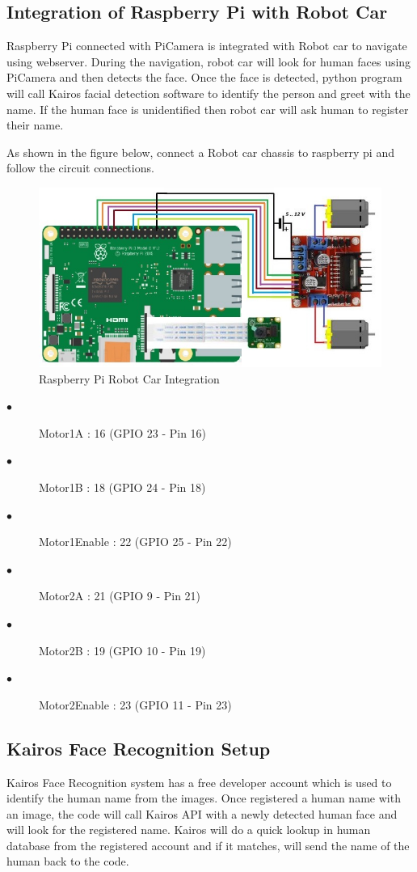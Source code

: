 \documentclass[sigconf]{acmart}
\begin{document}
\subsection{Integration of Raspberry Pi with Robot Car}
Raspberry Pi connected with PiCamera is integrated with Robot car to navigate using webserver. During the navigation, robot car will look for human faces using PiCamera and then detects the face. Once the face is detected, python program will call Kairos facial detection software to identify the person and greet with the name. If the human face is unidentified then robot car will ask human to register their name.

As shown in the figure below, connect a Robot car chassis to raspberry pi and follow the circuit connections.

\begin{figure}[ht!]
  \includegraphics[width=\columnwidth]{images/RaspPi_Robot.jpg}
  \caption{Raspberry Pi Robot Car Integration}
\end{figure}

\begin{description}
    \item[$\bullet$] Motor1A : 16 (GPIO 23 - Pin 16)
    \item[$\bullet$] Motor1B : 18 (GPIO 24 - Pin 18)
    \item[$\bullet$] Motor1Enable : 22 (GPIO 25 - Pin 22)
    \item[$\bullet$] Motor2A : 21 (GPIO 9 - Pin 21)
    \item[$\bullet$] Motor2B : 19 (GPIO 10 - Pin 19)
    \item[$\bullet$] Motor2Enable : 23 (GPIO 11 - Pin 23)
\end{description}

\subsection{Kairos Face Recognition Setup}
Kairos Face Recognition system has a free developer account which is used to identify the human name from the images. Once registered a human name with an image, the code will call Kairos API with a newly detected human face and will look for the registered name. Kairos will do a quick lookup in human database from the registered account and if it matches, will send the name of the human back to the code.
\end{document}
